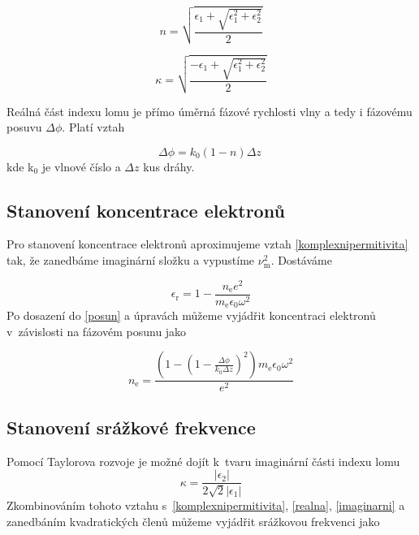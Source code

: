 \documentclass[a4paper,12pt]{article}
\begin{document}
\begin{equation}
	n = \sqrt{\frac{\epsilon_1 + \sqrt{\epsilon_1^2 + \epsilon_2^2}}{2}}
	\label{realna}
\end{equation}

\begin{equation}
	\kappa = \sqrt{\frac{-\epsilon_1 + \sqrt{\epsilon_1^2 + \epsilon_2^2}}{2}}
	\label{imaginarni}
\end{equation}

Reálná část indexu lomu je
přímo úměrná fázové rychlosti vlny a tedy i fázovému posuvu $\Delta\phi$. Platí vztah

\begin{equation}
 	\Delta\phi = k_0(1-n) \Delta
z~\label{posun}
\end{equation}
kde k$_0$ je vlnové číslo a $\Delta z$ kus dráhy.  

\subsection{Stanovení koncentrace elektronů}
Pro stanovení koncentrace elektronů aproximujeme vztah 
\eqref{komplexnipermitivita} tak, že zanedbáme imaginární složku a vypustíme 
$\nu_\text{m}^2$. Dostáváme

\begin{equation}
	\epsilon_\text{r} = 1- \frac{n_\text{e} e^2}{m_\text{e} \epsilon_0 \omega^2}
	\label{permitivita}
\end{equation}
Po dosazení do \eqref{posun} a úpravách můžeme vyjádřit koncentraci elektronů
v~závislosti na fázovém posunu jako

\begin{equation}
	n_\text{e} = \frac{\left(1-\left(1-\frac{\Delta\phi}{k_0 \Delta z} 
	\right)^2\right)
	m_\text{e} \epsilon_0 \omega^2}{e^2}
\label{eq:koncentrace}
\end{equation}

\subsection{Stanovení srážkové frekvence}
Pomocí Taylorova rozvoje je možné dojít k~tvaru imaginární části indexu lomu
\begin{equation}
	\kappa = \frac{|\epsilon_2|}{2\sqrt{2}|\epsilon_1|}
\end{equation}
Zkombinováním tohoto vztahu s~\eqref{komplexnipermitivita}, \eqref{realna}, \eqref{imaginarni} a zanedbáním kvadratických členů můžeme vyjádřit srážkovou frekvenci jako
\end{document}
